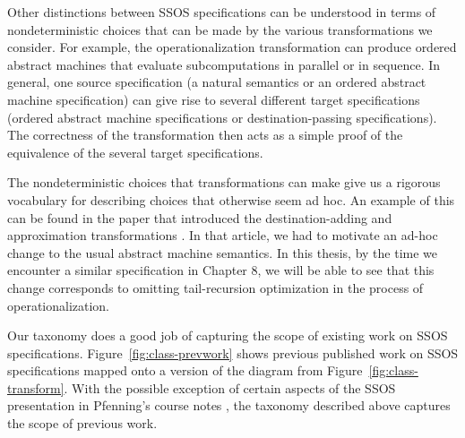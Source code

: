 Other distinctions between SSOS specifications can be understood in
terms of nondeterministic choices that can be made by the various
transformations we consider. For example, the operationalization
transformation can produce ordered abstract machines that evaluate
subcomputations in parallel or in sequence. In
general, one source specification (a natural semantics or an ordered
abstract machine specification) can give rise to several different
target specifications (ordered abstract machine specifications or
destination-passing specifications). The correctness of the
transformation then acts as a simple proof of the equivalence of the
several target specifications.

The nondeterministic choices that transformations can make give us a
rigorous vocabulary for describing choices that otherwise seem
ad hoc. An example of this can be found in the paper that introduced
the destination-adding and approximation transformations
\cite{simmons11logical}. In that article, we had to motivate an ad-hoc
change to the usual abstract machine semantics. In this thesis, by the
time we encounter a similar specification in Chapter 8, we will be
able to see that this change corresponds to omitting tail-recursion
optimization in the process of operationalization.

Our taxonomy does a good job of capturing the scope of existing work
on SSOS specifications.  Figure~\ref{fig:class-prevwork} shows
previous published work on SSOS specifications mapped onto a version
of the diagram from Figure~\ref{fig:class-transform}.  With the
possible exception of certain aspects of the SSOS presentation in
Pfenning's course notes \cite{pfenning12substructural}, the taxonomy
described above captures the scope of previous work.


